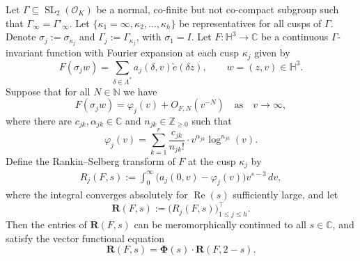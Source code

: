 \documentclass[12pt,reqno]{amsart}
\numberwithin{equation}{section}
\renewcommand{\Re}{\operatorname{Re}}
\begin{document}
\begin{prop} \label{zagreg}
    Let $\Gamma \subseteq \operatorname{SL}_2(\mathcal{O}_{K})$ be a normal, co-finite but not co-compact subgroup such that $\Gamma_\infty = \Gamma'_\infty$. Let $\{\kappa_1 = \infty,\kappa_2,\ldots,\kappa_h\}$ be representatives for all cusps of $\Gamma$. Denote $\sigma_j := \sigma_{\kappa_j}$ and $\Gamma_j := \Gamma_{\kappa_j}$, with $\sigma_1 = I$. Let $F:\mathbb{H}^3 \to \mathbb{C}$ be a continuous $\Gamma$-invariant function with Fourier expansion at each cusp $\kappa_j$ given by 
    \begin{equation} \label{fourierexp}
        F(\sigma_{j}w) = \sum_{\delta \in \Lambda^{*}} a_{j}(\delta,v) \check{e}(\delta z), \qquad w=(z,v) \in \mathbb{H}^3.
    \end{equation}
    Suppose that for all $N \in \mathbb{N}$ we have 
    \begin{equation} \label{cuspasymp}
        F(\sigma_{j} w)=\varphi_{j}(v)+O_{F,N}(v^{-N}) \quad \text{as} \quad v \to \infty,
    \end{equation}
    where there are $c_{jk},\alpha_{jk} \in \mathbb{C}$ and $n_{jk} \in \mathbb{Z}_{\geq 0}$ such that
    \begin{equation} \label{varphiexp}
        \varphi_{j}(v)=\sum_{k=1}^{r} \frac{c_{jk}}{n_{jk}!} \cdot v^{\alpha_{jk}} \log^{n_{jk}}(v).
    \end{equation}
    Define the Rankin--Selberg transform of $F$ at the cusp $\kappa_j$ by
    \begin{align} \label{RStransform1}
    R_{j}(F,s) := \int_{0}^{\infty} \big(a_{j}(0,v)-\varphi_{j}(v) \big) v^{s-3}\, dv, 
    \end{align}
    where the integral converges absolutely for $\Re(s)$ sufficiently large, and let 
    \begin{equation*}
    \boldsymbol{R}(F,s):= \Big ( R_{j}(F,s) \Big)^{\top}_{1 \leq j \leq h}.
    \end{equation*}
    Then the entries of $\boldsymbol{R}(F,s)$ 
    can be meromorphically continued 
    to all $s \in \mathbb{C}$, and satisfy the vector functional equation 
    \begin{equation} \label{Rstarfunc}
        \boldsymbol{R}(F,s)=\boldsymbol{\Phi}(s) \cdot \boldsymbol{R}(F,2-s).
    \end{equation}
    

\end{prop}
\end{document}
